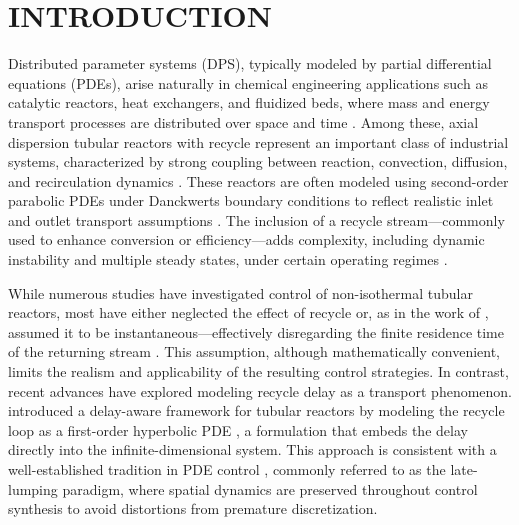 \section{INTRODUCTION}

Distributed parameter systems (DPS), typically modeled by partial differential equations (PDEs), arise naturally in chemical engineering applications such as catalytic reactors, heat exchangers, and fluidized beds, where mass and energy transport processes are distributed over space and time \autocite{ray1981advanced, davison1976robust,Curtain2020Introduction}. Among these, axial dispersion tubular reactors with recycle represent an important class of industrial systems, characterized by strong coupling between reaction, convection, diffusion, and recirculation dynamics \autocite{jensen1982bifurcation, Ali2015Review, Hlavacˇek1970Modeling,Hlavacˇek1970Modelinga,Cohen1974Tubular,Georgakis1977Studies}. These reactors are often modeled using second-order parabolic PDEs under Danckwerts boundary conditions to reflect realistic inlet and outlet transport assumptions \autocite{Danckwerts1953Continuous}. The inclusion of a recycle stream—commonly used to enhance conversion or efficiency—adds complexity, including dynamic instability and multiple steady states, under certain operating regimes \autocite{Luss1967Stability,Bildea2004Design}. 

While numerous studies have investigated control of non-isothermal tubular reactors, most have either neglected the effect of recycle or, as in the work of , assumed it to be instantaneous—effectively disregarding the finite residence time of the returning stream \autocite{Khatibi2021Model}. This assumption, although mathematically convenient, limits the realism and applicability of the resulting control strategies. In contrast, recent advances have explored modeling recycle delay as a transport phenomenon.  introduced a delay-aware framework for tubular reactors by modeling the recycle loop as a first-order hyperbolic PDE \autocite{moadeli2025optimal}, a formulation that embeds the delay directly into the infinite-dimensional system. This approach is consistent with a well-established tradition in PDE control \autocite{Christofides1997Finite,Armaou2002Dynamic, aksikas2017optimal,balas1979feedback,Curtain1982Finite}, commonly referred to as the late-lumping paradigm, where spatial dynamics are preserved throughout control synthesis to avoid distortions from premature discretization.

